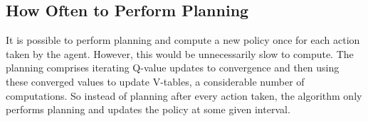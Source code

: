 \subsection{How Often to Perform Planning }
\label{sec:mbie_perform_planning}

It is possible to perform planning and compute a new policy once for each action taken by the agent. However, this would be unnecessarily slow to compute. The planning comprises iterating Q-value updates to convergence and then using these converged values to update V-tables, a considerable number of computations. So instead of planning after every action taken, the algorithm only performs planning and updates the policy at some given interval. 

